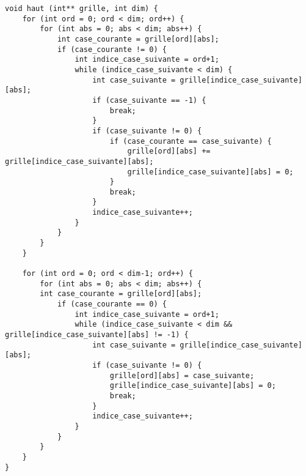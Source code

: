 \documentclass[12pt]{article}
\begin{document}
\begin{lstlisting}[style=mystyle, caption={bouger les pièces vers le haut}]
void haut (int** grille, int dim) {
    for (int ord = 0; ord < dim; ord++) {
        for (int abs = 0; abs < dim; abs++) {
            int case_courante = grille[ord][abs];
            if (case_courante != 0) {
                int indice_case_suivante = ord+1;
                while (indice_case_suivante < dim) {
                    int case_suivante = grille[indice_case_suivante][abs];
                    if (case_suivante == -1) {
                        break;
                    }
                    if (case_suivante != 0) {
                        if (case_courante == case_suivante) {
                            grille[ord][abs] += grille[indice_case_suivante][abs];
                            grille[indice_case_suivante][abs] = 0;
                        }
                        break;
                    }
                    indice_case_suivante++;
                }
            }
        }
    }

    for (int ord = 0; ord < dim-1; ord++) {
        for (int abs = 0; abs < dim; abs++) {
        int case_courante = grille[ord][abs];
            if (case_courante == 0) {
                int indice_case_suivante = ord+1;
                while (indice_case_suivante < dim && grille[indice_case_suivante][abs] != -1) {
                    int case_suivante = grille[indice_case_suivante][abs];
                    if (case_suivante != 0) {
                        grille[ord][abs] = case_suivante;
                        grille[indice_case_suivante][abs] = 0;
                        break;
                    }
                    indice_case_suivante++;
                }
            }
        }
    }
}
\end{lstlisting}
\end{document}
